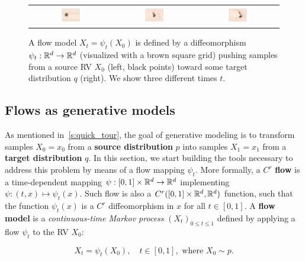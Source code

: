 \documentclass{fairmeta}
\newcommand{\highlight}[1]{{\color{metablue} \textbf{#1}}}
\numberwithin{equation}{section}
\begin{document}
\begin{figure}
    \centering
    \begin{tabular}{ccc}
         \includegraphics[width=0.3\textwidth]{assets/flow_velocity/flow_1_p.png} &
         \includegraphics[width=0.3\textwidth]{assets/flow_velocity/flow_10_p.png} &
         \includegraphics[width=0.3\textwidth]{assets/flow_velocity/flow_16_p.png} 
    \end{tabular}
    \caption{A flow model $X_t=\psi_t(X_0)$ is defined by a diffeomorphism $\psi_t:\mathbb R^d\rightarrow \mathbb R^d$ (visualized with a brown square grid) pushing samples from a source RV $X_0$ (left, black points) toward some target distribution $q$ (right). We show three different times $t$.}
    \label{fig:flow_model}
\end{figure}

\subsection{Flows as generative models}\label{ss:flows_and_velocities}


As mentioned in~\cref{s:quick_tour}, the goal of generative modeling is to transform samples $X_0 = x_0$ from a \highlight{source distribution} $p$ into samples $X_1=x_1$ from a \highlight{target distribution} $q$.
In this section, we start building the tools necessary to address this problem by means of a flow mapping $\psi_t$.
More formally, a $C^r$ \highlight{flow} is a time-dependent mapping $\psi:[0,1]\times \mathbb R^d\rightarrow\mathbb R^d$ implementing $\psi : (t,x) \mapsto \psi_t(x)$. 
Such flow is also a $C^r([0,1]\times\mathbb R^{d},\mathbb R^d)$ function, such that the function $\psi_t(x)$ is a $C^r$ diffeomorphism in $x$ for all $t \in [0, 1]$.
A \highlight{flow model} is a \emph{continuous-time Markov process} $(X_t)_{0 \leq t \leq 1}$ defined by applying a flow $\psi_t$ to the RV $X_0$:
\begin{myframe}
\begin{equation}\label{e:flow_model}
    X_t = \psi_t(X_0), \quad t\in [0,1], \text{ where } X_0\sim p. %
\end{equation}    
\end{myframe}
\end{document}
